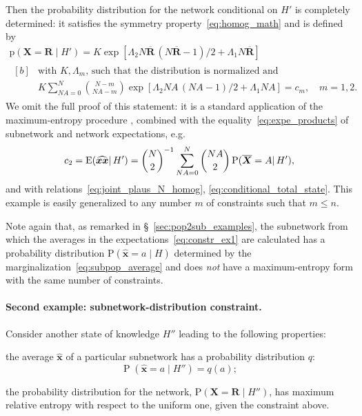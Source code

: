 \documentclass{article}
\newcommand*{\citep}{\parencites}
\theoremstyle{innote}
\newcommand*{\av}{\overline} %
\newcommand*{\sav}{\widehat} %
\newcommand*{\yx}{\bm{x}}%
\newcommand*{\yxs}{\sav{\yx}}%
\newcommand*{\yX}{\bm{X}}%
\newcommand*{\yXf}{\av{\yX}}%
\newcommand*{\yR}{\bm{R}}%
\newcommand*{\yRf}{\av{\yR}}%
\newcommand*{\yH}{\varEta}
\newcommand*{\yHa}{\varEta'}
\newcommand*{\yHb}{\varEta''}
\newcommand*{\yL}{\varLambda}
\newcommand*{\eg}{{e.g.}}
\newcommand*{\cond}%
{\mathpunct{|}}%
\renewcommand{\le}{\leqslant}%
\DeclareMathOperator{\pr}{P}%
\newcommand*{\pf}{\mathrm{p}}%
\newcommand*{\p}{\mathrm{P}}%
\renewcommand*{\|}{\cond}
\newcommand*{\+}{\lor}
\newcommand*{\sect}{\S}%
\let\varEta H
\let\varKappa K
\newcommand*{\E}{\mathrm{E}}
\DeclarePairedDelimiter\expp{(}{)}
\newcommand*{\expe}{\E\expp}%
\begin{document}
\medskip Then the probability distribution for the network conditional on $\yHa$
is completely determined: it satisfies the symmetry
property~\eqref{eq:homog_math} and is defined by
\begin{multline}
  \label{eq:pop_distr_maxent1}
  \pf(\yX =\yR \cond\yHa) =
\varKappa\exp[\yL_2 N\yRf\,(N\yRf-1)/2 + \yL_1 N\yRf]
\\
\!\begin{aligned}[b]
&\text{with $\varKappa, \yL_m$, such that the distribution is normalized and}
\\
&\varKappa\sum_{N A=0}^N %
\binom{N-m}{N A-m}
\exp[\yL_2 N A\,(N A-1)/2 + \yL_1 N A]
= c_m, \quad m=1,2.
\end{aligned}
\end{multline}
We omit the full proof of this statement: it is a standard application of
the maximum-entropy procedure
\citep[\eg:][]{jaynes1957,jaynes1963,good1963,jaynes1967,jaynes1979b,vancampenhoutetal1981,sivia1990,fangetal1997,bretthorst2013},
combined with the equality~\eqref{eq:expe_products} of subnetwork and
network expectations, \eg
\begin{equation}
  \label{eq:exploit_eq_expects}
  c_2 = \expe{\sav{\yx\yx}\cond\yHa} =
\binom{N}{2}^{-1}
\sum_{N A=0}^N %
\binom{N A}{2} \, \p(\yXf = A\cond\yHa),
\end{equation}
and with relations~\eqref{eq:joint_plaus_N_homog},
\eqref{eq:conditional_total_state}. This example is easily generalized to
any number $m$ of constraints such that  $m\le n$.

Note again that, as remarked in \sect~\ref{sec:pop2sub_examples}, the
subnetwork from which the averages in the
expectations~\eqref{eq:constr_ex1} are calculated has a probability
distribution $\p(\yxs =a \cond\yH)$ determined by the
marginalization~\eqref{eq:subpop_average} and does \emph{not} have a
maximum-entropy form with the same number of constraints.


\paragraph{Second example: subnetwork-distribution constraint.}
\label{sec:maxent_fullsubpop}
Consider another state of knowledge $\yHb$ leading to the following
properties:
\begin{asparaenum}[$\yHb$1.]
\item the average $\yxs$ of a particular
  subnetwork has a probability distribution $q$:
  \begin{equation}
    \label{eq:constr_subpop_distr}
    \pr(\yxs =a \cond\yHb) = q(a);
  \end{equation}
\item the probability distribution for the network, $\p(\yX = \yR
  \cond\yHb)$, has maximum relative entropy with respect to the uniform
  one, given the constraint above.
\end{asparaenum}
\end{document}
